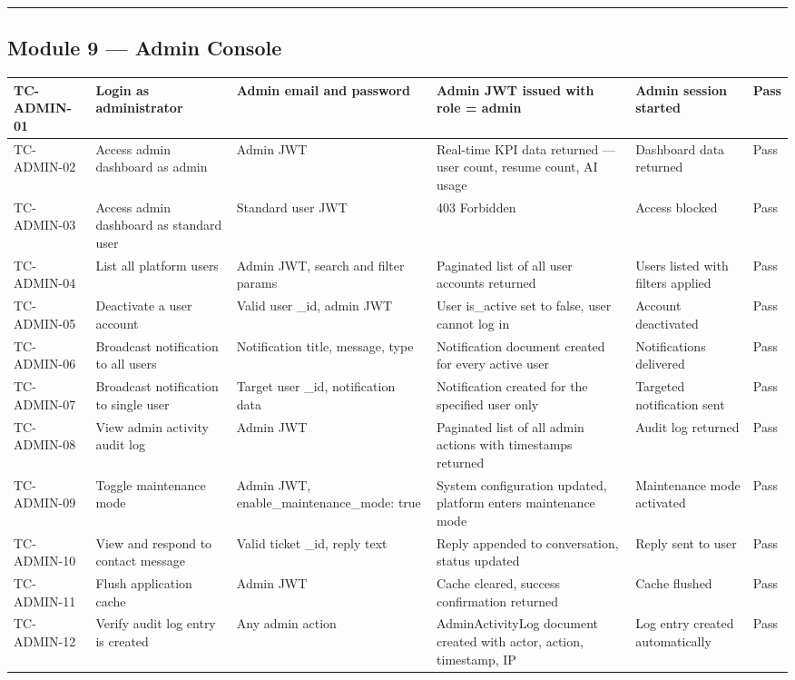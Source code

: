 \documentclass[12pt]{article}
\begin{document}
\noindent\rule{\textwidth}{0.4pt}

\subsection{Module 9 — Admin Console}


\begin{longtable}{|p{}|p{}|p{}|p{}|p{}|p{}|}
\hline
\textbf{TC-ADMIN-01} & \textbf{Login as administrator} & \textbf{Admin email and password} & \textbf{Admin JWT issued with role = admin} & \textbf{Admin session started} & \textbf{Pass} \\ \hline
\endhead
TC-ADMIN-02 & Access admin dashboard as admin & Admin JWT & Real-time KPI data returned — user count, resume count, AI usage & Dashboard data returned & Pass \\ \hline
TC-ADMIN-03 & Access admin dashboard as standard user & Standard user JWT & 403 Forbidden & Access blocked & Pass \\ \hline
TC-ADMIN-04 & List all platform users & Admin JWT, search and filter params & Paginated list of all user accounts returned & Users listed with filters applied & Pass \\ \hline
TC-ADMIN-05 & Deactivate a user account & Valid user \_id, admin JWT & User is\_active set to false, user cannot log in & Account deactivated & Pass \\ \hline
TC-ADMIN-06 & Broadcast notification to all users & Notification title, message, type & Notification document created for every active user & Notifications delivered & Pass \\ \hline
TC-ADMIN-07 & Broadcast notification to single user & Target user \_id, notification data & Notification created for the specified user only & Targeted notification sent & Pass \\ \hline
TC-ADMIN-08 & View admin activity audit log & Admin JWT & Paginated list of all admin actions with timestamps returned & Audit log returned & Pass \\ \hline
TC-ADMIN-09 & Toggle maintenance mode & Admin JWT, enable\_maintenance\_mode: true & System configuration updated, platform enters maintenance mode & Maintenance mode activated & Pass \\ \hline
TC-ADMIN-10 & View and respond to contact message & Valid ticket \_id, reply text & Reply appended to conversation, status updated & Reply sent to user & Pass \\ \hline
TC-ADMIN-11 & Flush application cache & Admin JWT & Cache cleared, success confirmation returned & Cache flushed & Pass \\ \hline
TC-ADMIN-12 & Verify audit log entry is created & Any admin action & AdminActivityLog document created with actor, action, timestamp, IP & Log entry created automatically & Pass \\ \hline
\end{longtable}
\end{document}
